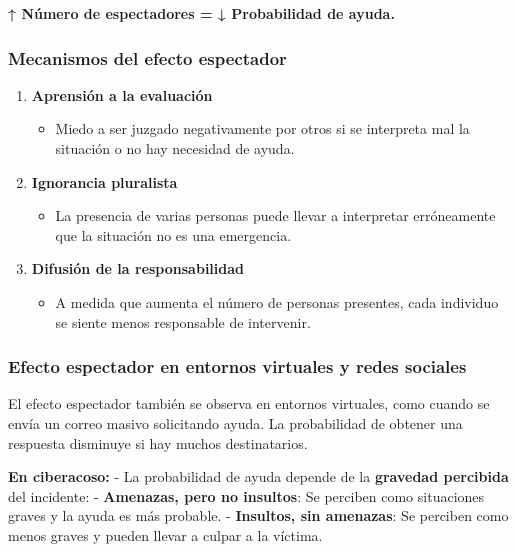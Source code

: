 \documentclass[
]{book}
\providecommand{\tightlist}{%
  \setlength{\itemsep}{0pt}\setlength{\parskip}{0pt}}
\begin{document}
\textbf{↑ Número de espectadores = ↓ Probabilidad de ayuda.}

\subsubsection{Mecanismos del efecto espectador}\label{mecanismos-del-efecto-espectador}

\begin{enumerate}
\def\labelenumi{\arabic{enumi}.}
\tightlist
\item
  \textbf{Aprensión a la evaluación}

  \begin{itemize}
  \tightlist
  \item
    Miedo a ser juzgado negativamente por otros si se interpreta mal la situación o no hay necesidad de ayuda.
  \end{itemize}
\item
  \textbf{Ignorancia pluralista}

  \begin{itemize}
  \tightlist
  \item
    La presencia de varias personas puede llevar a interpretar erróneamente que la situación no es una emergencia.
  \end{itemize}
\item
  \textbf{Difusión de la responsabilidad}

  \begin{itemize}
  \tightlist
  \item
    A medida que aumenta el número de personas presentes, cada individuo se siente menos responsable de intervenir.
  \end{itemize}
\end{enumerate}

\subsubsection{Efecto espectador en entornos virtuales y redes sociales}\label{efecto-espectador-en-entornos-virtuales-y-redes-sociales}

El efecto espectador también se observa en entornos virtuales, como cuando se envía un correo masivo solicitando ayuda. La probabilidad de obtener una respuesta disminuye si hay muchos destinatarios.

\textbf{En ciberacoso:}
- La probabilidad de ayuda depende de la \textbf{gravedad percibida} del incidente:
- \textbf{Amenazas, pero no insultos}: Se perciben como situaciones graves y la ayuda es más probable.
- \textbf{Insultos, sin amenazas}: Se perciben como menos graves y pueden llevar a culpar a la víctima.
\end{document}
